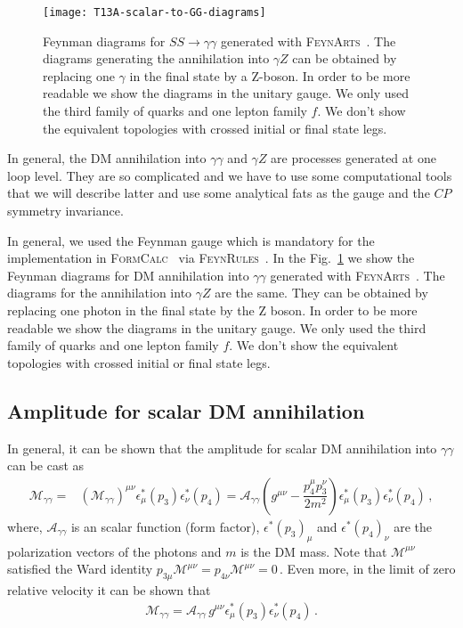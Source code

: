 \begin{figure}
\centering
\texttt{[image: T13A-scalar-to-GG-diagrams]}
\caption{Feynman diagrams for $S S \to\gamma\gamma$ generated with \textsc{FeynArts}~\cite{Hahn:2000kx}. The diagrams generating the annihilation into $\gamma Z$ can be obtained by replacing one $\gamma$ in the final state by a Z-boson. In order to be more readable we show the diagrams in the unitary gauge. We only used the third family of quarks and one lepton family $f$.  We don't show the equivalent topologies with crossed initial or final state legs.}
\label{fig:scalar-to-GG}
\end{figure}

In general, the DM annihilation into $\gamma\gamma$ and $\gamma Z$ are processes generated at one loop level. They are so complicated and we have to use some computational tools that we will describe latter and use some analytical fats as the gauge and the $CP$ symmetry invariance.

In general, we used the Feynman gauge which is mandatory for the implementation in \textsc{FormCalc}~\cite{Hahn:1998yk} via \textsc{FeynRules}~\cite{Christensen:2008py}. In the Fig.~\ref{fig:scalar-to-GG} we show the Feynman diagrams for DM annihilation into $\gamma\gamma$ generated with \textsc{FeynArts}~\cite{Hahn:2000kx}. The diagrams for the annihilation into $\gamma Z$ are the same. They can be obtained by replacing one photon in the final state by the Z boson. In order to be more readable we show the diagrams in the unitary gauge. We only used the third family of quarks and one lepton family $f$.  We don't show the equivalent topologies with crossed initial or final state legs.

\subsection{Amplitude for scalar DM annihilation}

In general, it can be shown that the amplitude for scalar DM annihilation into $\gamma\gamma$ can be cast as
%
\begin{align}
\mathcal{M_{\gamma\gamma}}=&(\mathcal{M_{\gamma\gamma}})^{\mu\nu}\epsilon_{\mu}^*(p_3)\epsilon_{\nu}^*(p_4)
=\mathcal{A}_{\gamma\gamma}\left(g^{\mu\nu}-\dfrac{p_4^{\mu}p_3^{\nu}}{2m^2}\right)\epsilon_{\mu}^*(p_3)\epsilon_{\nu}^*(p_4)\,,
\end{align} 
%
where, $\mathcal{A}_{\gamma\gamma}$ is an scalar function (form factor), $\epsilon^*(p_3)_{\mu}$ and $\epsilon^*(p_4)_{\nu}$ are the polarization vectors of the photons and $m$ is the DM mass. Note that $\mathcal{M}^{\mu\nu}$ satisfied the Ward identity
$p_{3\mu}\mathcal{M}^{\mu\nu}=p_{4\nu}\mathcal{M}^{\mu\nu}=0\,$.
Even more, in the limit of zero relative velocity it can be shown that
%
\begin{align}
\label{eq:M-scalar-GG}
\mathcal{M_{\gamma\gamma}}=\mathcal{A}_{\gamma\gamma}\,g^{\mu\nu}\epsilon_{\mu}^*(p_3)\epsilon_{\nu}^*(p_4)\,.
\end{align}

